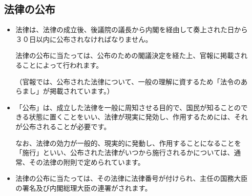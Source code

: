 \subsection {法律の公布}
\begin {itemize}
\item 法律は、法律の成立後、後議院の議長から内閣を経由して奏上された日から３０日以内に公布されなければなりません。\par
  法律の公布に当たっては、公布のための閣議決定を経た上、官報に掲載されることによって行われます。\par
  （官報では、公布された法律について、一般の理解に資するため「法令のあらまし」が掲載されています。）\par
\item 「公布」は、成立した法律を一般に周知させる目的で、国民が知ることのできる状態に置くことをいい、法律が現実に発効し、作用するためには、それが公布されることが必要です。\par
  なお、法律の効力が一般的、現実的に発動し、作用することになることを「施行」といい、公布された法律がいつから施行されるかについては、通常、その法律の附則で定められています。\par
\item 法律の公布に当たっては、その法律に法律番号が付けられ、主任の国務大臣の署名及び内閣総理大臣の連署がされます。\par
\end {itemize}


